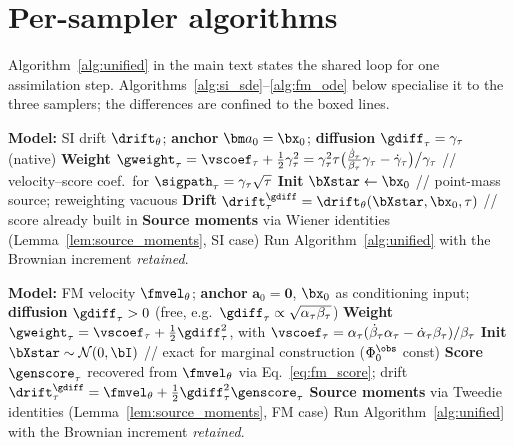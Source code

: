 \section{Per-sampler algorithms}\label{appendix:algorithms}
Algorithm~\ref{alg:unified} in the main text states the shared loop for one assimilation step. Algorithms~\ref{alg:si_sde}--\ref{alg:fm_ode} below specialise it to the three samplers; the differences are confined to the boxed lines.

\begin{algorithm}[ht]
\caption{Sampler 1 -- Stochastic interpolant SDE (native diffusion)}
\label{alg:si_sde}
\begin{algorithmic}[1]
\STATE \textbf{Model:} SI drift $\drift_\theta$; \textbf{anchor} $\bm a_0=\bx_0$; \textbf{diffusion} $\gdiff_\tau=\gamma_\tau$ (native)
\STATE \textbf{Weight} $\gweight_\tau = \vscoef_\tau + \tfrac12\gamma_\tau^2 = \gamma_\tau^2\tau\big(\tfrac{\dot\beta_\tau}{\beta_\tau}\gamma_\tau-\dot\gamma_\tau\big)\big/\gamma_\tau$ \hfill // velocity--score coef.\ for $\sigpath_\tau=\gamma_\tau\sqrt\tau$
\STATE \textbf{Init} $\bXstar\leftarrow\bx_0$ \hfill // point-mass source; reweighting vacuous
\STATE \textbf{Drift} $\drift^{\gdiff}_\tau=\drift_\theta(\bXstar,\bx_0,\tau)$ \hfill // score already built in
\STATE \textbf{Source moments} via Wiener identities (Lemma~\ref{lem:source_moments}, SI case)
\STATE Run Algorithm~\ref{alg:unified} with the Brownian increment \emph{retained}.
\end{algorithmic}
\end{algorithm}

\begin{algorithm}[ht]
\caption{Sampler 2 -- Flow matching SDE (lifted diffusion)}
\label{alg:fm_sde}
\begin{algorithmic}[1]
\STATE \textbf{Model:} FM velocity $\fmvel_\theta$; \textbf{anchor} $\bm a_0=\bm 0$, $\bx_0$ as conditioning input; \textbf{diffusion} $\gdiff_\tau>0$ (free, e.g.\ $\gdiff_\tau\propto\sqrt{\alpha_\tau\beta_\tau}$)
\STATE \textbf{Weight} $\gweight_\tau = \vscoef_\tau + \tfrac12\gdiff_\tau^2$, with $\vscoef_\tau=\alpha_\tau(\dot\beta_\tau\alpha_\tau-\dot\alpha_\tau\beta_\tau)/\beta_\tau$
\STATE \textbf{Init} $\bXstar\sim\mathcal{N}(0,\bI)$ \hfill // exact for marginal construction ($\Phi_0^{\obs}$ const)
\STATE \textbf{Score} $\genscore_\tau$ recovered from $\fmvel_\theta$ via Eq.~\eqref{eq:fm_score}; drift $\drift^{\gdiff}_\tau=\fmvel_\theta+\tfrac12\gdiff_\tau^2\genscore_\tau$
\STATE \textbf{Source moments} via Tweedie identities (Lemma~\ref{lem:source_moments}, FM case)
\STATE Run Algorithm~\ref{alg:unified} with the Brownian increment \emph{retained}.
\end{algorithmic}
\end{algorithm}

